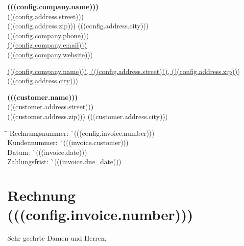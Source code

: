 \documentclass[a4paper, article, oneside, hidelinks, (((config.style.font_size)))pt]{memoir}
\begin{document}
\begin{raggedleft}
	\small
	\textbf{(((config.company.name)))} \\
	(((config.address.street))) \\
	(((config.address.zip))) (((config.address.city))) \\
	(((config.company.phone))) \\
	\href{mailto:(((config.company.email)))}{(((config.company.email)))} \\
	\href{https://(((config.company.website)))}{(((config.company.website)))} \\
\end{raggedleft}

\vspace{1cm}

\begin{minipage}[t]{0.6\textwidth}
	{\scriptsize \underline{(((config.company.name))), (((config.address.street))), (((config.address.zip))) (((config.address.city)))}}

	\medskip

	{\large \textbf{(((customer.name)))}} \\
	(((customer.address.street))) \\
	(((customer.address.zip))) (((customer.address.city)))
\end{minipage}
\begin{minipage}[t]{0.4\textwidth}
	\small
	\begin{tabbing}
		\hspace{0.2\textwidth} \= \hspace{0.2\textwidth} \kill
		Rechnungsnummer: \` \hfill (((config.invoice.number))) \\
		Kundennummer: \` \hfill (((invoice.customer))) \\
		Datum: \` \hfill (((invoice.date))) \\
		Zahlungsfrist: \` \hfill (((invoice.due_date))) \\
	\end{tabbing}
\end{minipage}

\vspace{2cm}

\chapter*{Rechnung (((config.invoice.number)))}

Sehr geehrte Damen und Herren,
\end{document}
